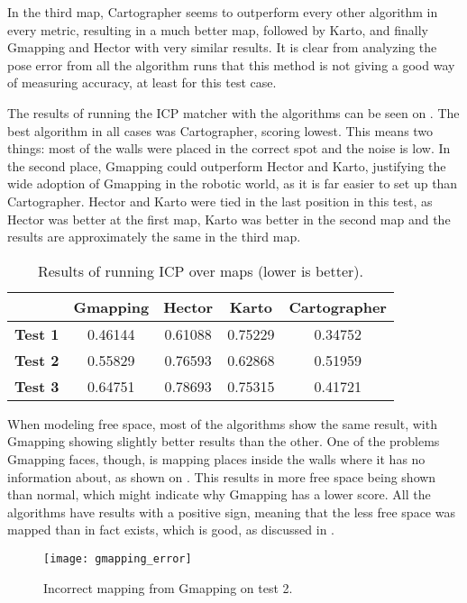 In the third map, Cartographer seems to outperform every other algorithm in every metric, resulting in a much better map, followed by Karto, and finally Gmapping and Hector with very similar results. It is clear from analyzing the pose error from all the algorithm runs that this method is not giving a good way of measuring accuracy, at least for this test case.

The results of running the ICP matcher with the algorithms can be seen on . The best algorithm in all cases was Cartographer, scoring lowest. This means two things: most of the walls were placed in the correct spot and the noise is low. In the second place, Gmapping could outperform Hector and Karto, justifying the wide adoption of Gmapping in the robotic world, as it is far easier to set up than Cartographer. Hector and Karto were tied in the last position in this test, as Hector was better at the first map, Karto was better in the second map and the results are approximately the same in the third map.

\begin{table}[!ht]
\centering
\renewcommand*{\arraystretch}{1.1}
\begin{tabular}{c|c|c|c|c}
& \textbf{Gmapping} & \textbf{Hector} & \textbf{Karto} & \textbf{Cartographer} \\ \hline
\textbf{Test 1} & 0.46144 & 0.61088 & 0.75229 & 0.34752 \\
\textbf{Test 2} & 0.55829 & 0.76593 & 0.62868 & 0.51959 \\
\textbf{Test 3} & 0.64751 & 0.78693 & 0.75315 & 0.41721 \\
 \hline
\end{tabular}
\caption{Results of running ICP over maps (lower is better).}
\label{tab:results_icp}
\end{table}

When modeling free space, most of the algorithms show the same result, with Gmapping showing slightly better results than the other. One of the problems Gmapping faces, though, is mapping places inside the walls where it has no information about, as shown on . This results in more free space being shown than normal, which might indicate why Gmapping has a lower score. All the algorithms have results with a positive sign, meaning that the less free space was mapped than in fact exists, which is good, as discussed in .

\begin{figure}[!ht]
     \centering
     \texttt{[image: gmapping\_error]}
     \caption{Incorrect mapping from Gmapping on test 2.}
     \label{fig:gmapping_error}
\end{figure}

